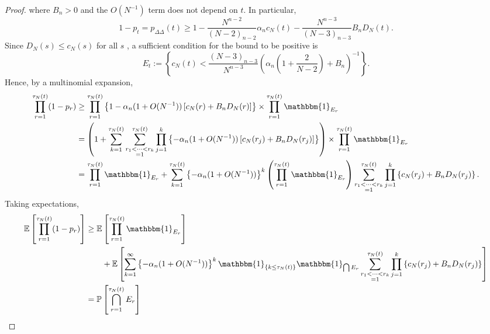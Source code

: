 \documentclass{article}
\newcommand{\Prob}{\mathbb{P}}
\newcommand{\E}{\mathbb{E}}
\newcommand{\I}[1]{\mathbbm{1}_{\{#1\}}}
\newcommand{\1}[1]{\mathbbm{1}_{#1}}
\begin{document}
\begin{proof}
where $B_n >0$ and the $O(N^{-1})$ term does not depend on $t$.
In particular,
\begin{equation}
1-p_t = p_{\Delta\Delta}(t) \geq 1 - \frac{N^{n-2}}{(N-2)_{n-2}} \alpha_n c_N(t) - \frac{N^{n-3}}{(N-3)_{n-3}} B_n D_N(t) .
\end{equation}
Since $D_N(s) \leq c_N(s)$ for all $s$ \citep[p.9]{koskela2018}, a sufficient condition for the bound to be positive is
\begin{equation}\label{eq:11a}
E_t := \left\{ c_N(t) < \frac{(N-3)_{n-3}}{N^{n-3}} \left( \alpha_n \left(1 + \frac{2}{N-2} \right) + B_n \right)^{-1} \right\} .
\end{equation}
Hence, by a multinomial expansion,
\begin{align}
\prod_{r=1}^{\tau_N(t)} (1-p_r)
&\geq \prod_{r=1}^{\tau_N(t)} \left\{ 1 - \alpha_n (1+O(N^{-1}))\left[ c_N(r) + B_n D_N(r) \right] \right\}
\times \prod_{r=1}^{\tau_N(t)} \1{E_r} \notag\\
&= \left( 1 + \sum_{k=1}^{\tau_N(t)} \sum_{\substack{r_1<\dots<r_k \\ =1}}^{\tau_N(t)}\prod_{j=1}^k 
\left\{ - \alpha_n (1+O(N^{-1})) \left[ c_N(r_j) + B_n D_N(r_j) \right] \right\} \right)
\times \prod_{r=1}^{\tau_N(t)} \1{E_r} \notag\\
&= \prod_{r=1}^{\tau_N(t)} \1{E_r} 
+ \sum_{k=1}^{\tau_N(t)} \left\{- \alpha_n (1+O(N^{-1}))\right\}^k 
\left(\prod_{r=1}^{\tau_N(t)} \1{E_r} \right)
\sum_{\substack{r_1<\dots<r_k \\ =1}}^{\tau_N(t)}\prod_{j=1}^k 
\left\{ c_N(r_j) + B_n D_N(r_j) \right\} . \label{eq:12}
\end{align}
Taking expectations,
\begin{align}\label{eq:9}
\E \left[ \prod_{r=1}^{\tau_N(t)} (1-p_r) \right]
&\geq \E\left[ \prod_{r=1}^{\tau_N(t)} \1{E_r} \right] \notag\\
&\qquad + \E \left[ \sum_{k=1}^{\infty} \left\{- \alpha_n (1+O(N^{-1}))\right\}^k \I{k \leq \tau_N(t)} \1{\bigcap E_r} \sum_{\substack{r_1<\dots<r_k \\ =1}}^{\tau_N(t)}\prod_{j=1}^k 
\left\{ c_N(r_j) + B_n D_N(r_j) \right\} \right] \notag\\
&= \Prob \left[ \bigcap_{r=1}^{\tau_N(t)} E_r \right] \notag\\

\end{align}
\end{proof}
\end{document}
